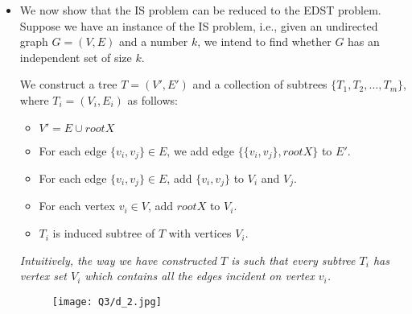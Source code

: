 \documentclass[11pt, fleqn]{article}
\begin{document}
\begin{itemize}
\begin{proof}
\begin{itemize}
            Consider an arbitrary pair of distinct vertices $v_{i_x}$ and $v_{i_y}$. Suppose they have an edge between them in $G'$. Then, by construction of $G'$, we know that $E_{i_x} \cap E_{i_y} \neq \phi$. But this contradicts the fact that $T_{i_x}$ and $T_{i_y}$ are edge-disjoint, as both belong to $S$. Thus, $v_{i_x}$ and $v_{i_y}$ cannot be connected by an edge in $G'$.
            
            Since $x$ and $y$ were arbitrary, the set $S'$ must form an independent set of $G'$.
            \item[($\Leftarrow$)]
            Suppose $G'$ has an independent set of size $k$, which is $S' = \{v_{i_1}, v_{i_2}, \dots, v_{i_k}\}$. We can prove that $S = \{T_{i_1}, T_{i_2}, \dots, T_{i_k}\}$ is a set of $k$ edge-disjoint subtrees of $T$.
            
            Consider an arbitrary pair of distinct subtrees $T_{i_x}$ and $T_{i_y}$. Suppose they are not edge-disjoint, i.e., $E_{i_x} \cap E_{i_y} \neq \phi$. This implies there is an edge connecting $v_{i_x}$ and $v_{i_y}$ in $G'$, by the way in which $G'$ was constructed. But this contradicts the fact that both $v_{i_x}$ and $v_{i_y}$ belong to the independent set $S'$. Thus, $T_{i_x}$ and $T_{i_y}$ must be edge-disjoint.
            
            Since $x$ and $y$ were arbitrary, the set $S$ must consist of $k$ edge-disjoint subtrees of $T$.
        \end{itemize}
    \end{proof}
    With this, we conclude that the EDST problem can be reduced to the independent set problem.
    
    \item
    We now show that the IS problem can be reduced to the EDST problem. Suppose we have an instance of the IS problem, i.e., given an undirected graph $G = (V, E)$ and a number $k$, we intend to find whether $G$ has an independent set of size $k$.
    
    We construct a tree $T = (V', E')$ and a collection of subtrees $\{T_1, T_2, \dots, T_m\}$, where $T_i = (V_i, E_i)$ as follows:
    \begin{itemize}
        \item $V' = E \cup {root X}$
        \item For each edge $\{v_i, v_j\} \in E$, we add edge $\{\{v_i, v_j\}, root X\}$ to $E'$.
        \item For each edge $\{v_i, v_j\} \in E$, add $\{v_i, v_j\}$ to $V_i$ and $V_j$.
        \item For each vertex $v_i \in V$, add $root X$ to $V_i$.
        \item $T_i$ is induced subtree of $T$ with vertices $V_i$.
    \end{itemize}
    \textit{Intuitively, the way we have constructed $T$ is such that every subtree $T_i$ has vertex set $V_i$ which contains all the edges incident on vertex $v_i$.}
    \begin{figure}[H]
        \texttt{[image: Q3/d\_2.jpg]}
    \end{figure}
    

\end{itemize}
\end{document}
